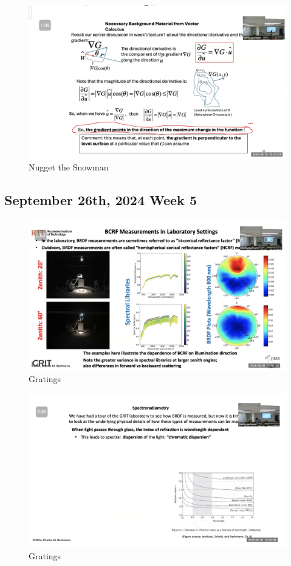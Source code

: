 \documentclass{article}
\begin{document}
\begin{figure}[h!]
\centering
\includegraphics[scale=.6]{Radiometry/Week4/Notes/PSET2/Gradiant.png}
\caption{Nugget the Snowman}
\label{fig:Blackbody}
\end{figure}
\clearpage
\subsection{September 26th, 2024 Week 5}
\begin{figure}[h!]
\centering
\includegraphics[scale=.4]{Radiometry/Week5/Notes/Gratings/MUM1.png}
\caption{Gratings}
\label{fig:Blackbody}
\end{figure}

\begin{figure}[h!]
\centering
\includegraphics[scale=.4]{Radiometry/Week5/Notes/Gratings/MUM2.png}
\caption{Gratings}
\label{fig:Blackbody}
\end{figure}
\end{document}
